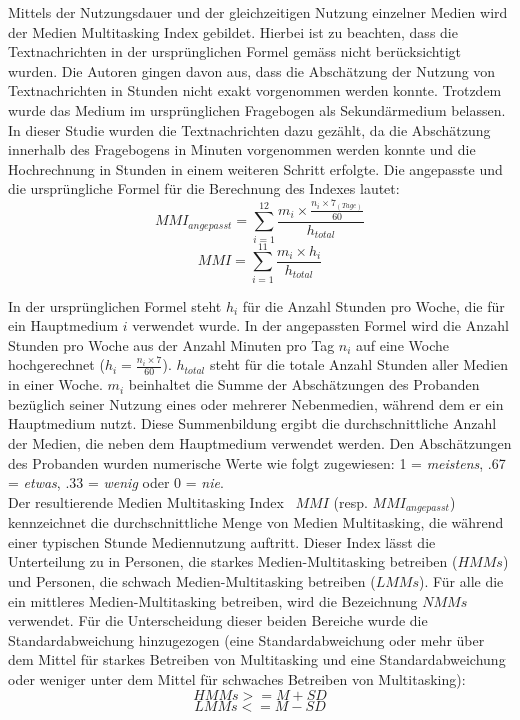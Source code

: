 Mittels der Nutzungsdauer und der gleichzeitigen Nutzung einzelner Medien wird der Medien Multitasking Index gebildet. Hierbei ist zu beachten, dass die Textnachrichten in der ursprünglichen Formel gemäss \cite{Ophir2009}  nicht berücksichtigt wurden. Die Autoren gingen davon aus, dass die Abschätzung der Nutzung von Textnachrichten in Stunden nicht exakt vorgenommen werden konnte. Trotzdem wurde das Medium im ursprünglichen Fragebogen als Sekundärmedium belassen. In dieser Studie wurden die Textnachrichten dazu gezählt, da die Abschätzung innerhalb des Fragebogens in Minuten vorgenommen werden konnte und die Hochrechnung in Stunden in einem weiteren Schritt erfolgte. Die angepasste und die ursprüngliche Formel für die Berechnung des Indexes lautet:
\begin{equation}\label{formel.mmiext}
    MMI_{angepasst}=\sum_{i=1}^{12} \frac{m_{i} \times \frac{n_{i} \times 7_{(Tage)}}{60}}{h_{total}}
\end{equation}
\begin{equation}\label{formel.mmi}
    MMI=\sum_{i=1}^{11} \frac{m_{i} \times h_{i}}{h_{total}}
\end{equation}

In der ursprünglichen Formel steht \(h_{i}\) für die Anzahl Stunden pro Woche, die für ein Hauptmedium \(i\) verwendet wurde. In der angepassten Formel wird die Anzahl Stunden pro Woche aus der Anzahl Minuten pro Tag \(n_i\) auf eine Woche hochgerechnet (\(h_{i}=\frac{n_{i} \times 7}{60}\)). \(h_{total}\) steht für die totale Anzahl Stunden aller Medien in einer Woche. \(m_i\) beinhaltet die Summe der Abschätzungen des Probanden bezüglich seiner Nutzung eines oder mehrerer Nebenmedien, während dem er ein Hauptmedium nutzt. Diese Summenbildung ergibt die durchschnittliche Anzahl der Medien, die neben dem Hauptmedium verwendet werden. Den Abschätzungen des Probanden wurden numerische Werte wie folgt zugewiesen: 1 = \textit{meistens}, .67 = \textit{etwas}, .33 = \textit{wenig} oder 0 = \textit{nie}. \\
Der resultierende Medien Multitasking Index \
$MMI$ (resp. $MMI_{angepasst}$) kennzeichnet die durchschnittliche Menge von Medien Multitasking, die während einer typischen Stunde Mediennutzung auftritt. Dieser Index lässt die Unterteilung zu in Personen, die starkes Medien-Multitasking betreiben ($HMMs$) und Personen, die schwach Medien-Multitasking betreiben ($LMMs$). Für alle die ein mittleres Medien-Multitasking betreiben, wird die Bezeichnung $NMMs$ verwendet. Für die Unterscheidung dieser beiden Bereiche wurde die Standardabweichung hinzugezogen (eine Standardabweichung oder mehr über dem Mittel für starkes Betreiben von Multitasking und eine Standardabweichung oder weniger unter dem Mittel für schwaches Betreiben von Multitasking): 
\begin{equation}\label{formel.hmms}
    HMMs>=M+SD
\end{equation}
\begin{equation}\label{formel.hmms}
    LMMs<=M-SD
\end{equation}

